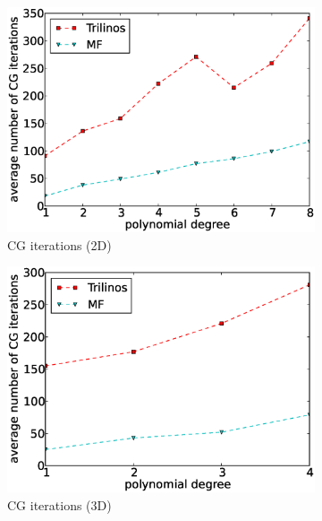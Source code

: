 \documentclass[AMA,STIX1COL]{WileyNJD-v2}
\begin{document}
\begin{figure}[!ht]
  \begin{subfigure}[b]{0.49\textwidth}
    \centering
    \includegraphics[width=\textwidth]{IWR_newest_patched_cg2d.eps}
    \caption{CG iterations (2D)}
    \label{fig:benchmark_miehe_IWR_cg2}
  \end{subfigure}
  \begin{subfigure}[b]{0.49\textwidth}
    \centering
    \includegraphics[width=\textwidth]{IWR_newest_patched_cg3d.eps}
    \caption{CG iterations (3D)}
    \label{fig:benchmark_miehe_IWR_cg3}
  \end{subfigure}
  ~
  \begin{subfigure}[b]{0.49\textwidth}
    \centering

\end{subfigure}
\end{figure}
\end{document}
